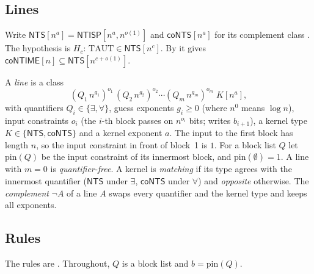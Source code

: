 \documentclass[11pt]{article}
\theoremstyle{definition}
\newcommand{\NTS}{\mathsf{NTS}}
\newcommand{\coNTS}{\mathsf{coNTS}}
\newcommand{\coNTIME}{\mathsf{coNTIME}}
\newcommand{\NTISP}{\mathsf{NTISP}}
\newcommand{\TAUT}{\mathrm{TAUT}}
\newcommand{\pin}{\mathrm{pin}}
\begin{document}
\subsection{Lines}

Write $\NTS[n^a]=\NTISP[n^{a},n^{o(1)}]$ and $\coNTS[n^a]$ for its complement class \cite[\S6.1]{W13}. The hypothesis is $H_c$: $\TAUT\in\NTS[n^c]$. By \cite[Theorem~3.1]{W13} it gives $\coNTIME[n]\subseteq\NTS[n^{c+o(1)}]$.

A \emph{line} is a class
\[
(Q_1\, n^{g_1})^{o_1}\,(Q_2\, n^{g_2})^{o_2}\cdots(Q_m\, n^{g_m})^{o_m}\; K[n^{a}],
\]
with quantifiers $Q_i\in\{\exists,\forall\}$, guess exponents $g_i\ge0$ (where $n^0$ means $\log n$), input constraints $o_i$ (the $i$-th block passes on $n^{o_i}$ bits; \cite{W13} writes $b_{i+1}$), a kernel type $K\in\{\NTS,\coNTS\}$ and a kernel exponent $a$. The input to the first block has length $n$, so the input constraint in front of block~1 is $1$. For a block list $Q$ let $\pin(Q)$ be the input constraint of its innermost block, and $\pin(\emptyset)=1$. A line with $m=0$ is \emph{quantifier-free}. A kernel is \emph{matching} if its type agrees with the innermost quantifier ($\NTS$ under $\exists$, $\coNTS$ under $\forall$) and \emph{opposite} otherwise. The \emph{complement} $\neg A$ of a line $A$ swaps every quantifier and the kernel type and keeps all exponents.

\subsection{Rules}

The rules are \cite[Lemmas~6.1 and~6.2]{W13}. Throughout, $Q$ is a block list and $b=\pin(Q)$.
\end{document}

